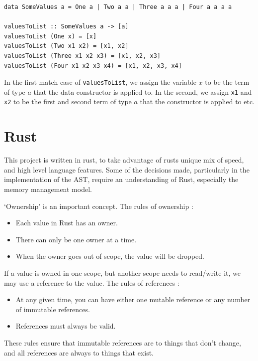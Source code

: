 \begin{lstlisting}[language=SFL]
data SomeValues a = One a | Two a a | Three a a a | Four a a a a

valuesToList :: SomeValues a -> [a]
valuesToList (One x) = [x]
valuesToList (Two x1 x2) = [x1, x2]
valuesToList (Three x1 x2 x3) = [x1, x2, x3]
valuesToList (Four x1 x2 x3 x4) = [x1, x2, x3, x4]
\end{lstlisting}

\noindent In the first match case of \verb|valuesToList|, we assign the variable $x$ to be the term of type $a$ that the data constructor  is applied to. In the second, we assign \verb|x1| and \verb|x2| to be the first and second term of type $a$ that the constructor  is applied to etc. 

\section{Rust}
\label{bg:rust}

This project is written in rust, to take advantage of rusts unique mix of speed, and high level language features. Some of the decisions made, particularly in the implementation of the AST, require an understanding of Rust, especially the memory management model.

`Ownership' is an important concept. The rules of ownership \cite{rust_book}:
\begin{itemize}
    \item Each value in Rust has an owner.
    \item There can only be one owner at a time.
    \item When the owner goes out of scope, the value will be dropped.
\end{itemize}   

\noindent If a value is owned in one scope, but another scope needs to read/write it, we may use a reference to the value. The rules of references \cite{rust_book}:
\begin{itemize}
    \item At any given time, you can have either one mutable reference or any number of immutable references. 
    \item References must always be valid.
\end{itemize}

These rules ensure that immutable references are to things that don't change, and all references are always to things that exist.

